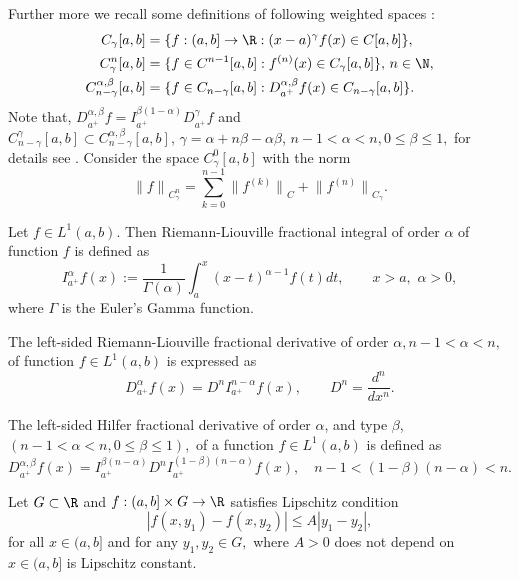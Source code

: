  Further more we recall some
definitions of following weighted spaces \cite{kst}:
\begin{align}\label{e1}
  C_{\gamma}[a,b]&=\{f:(a,b]\to\R :  (x-a)^{\gamma}f(x)\in C[a,b]\},\nonumber\\
  C_{\gamma}^{n}[a,b]&=\{f\in C^{n-1}[a,b]:f^{(n)}(x)\in C_{\gamma}[a,b]\},\, n\in \N,\\
  C_{n-\gamma}^{\alpha,\beta}[a,b]&=\{f\in C_{n-\gamma}[a,b]:D_{a^+}^{\alpha,\beta}f(x)\in C_{n-\gamma}[a,b]\}.\nonumber
\end{align}
Note that,
$D_{a^+}^{\alpha,\beta}f=I_{a^+}^{\beta(1-\alpha)}D_{a^+}^{\gamma}f$ and
$C_{n-\gamma}^{\gamma}[a,b]\subset
C_{n-\gamma}^{\alpha,\beta}[a,b],\,\gamma=\alpha+n\beta-\alpha\beta$,
$n-1<\alpha<n, 0\leq\beta\leq1,$ for details see \cite{kmf}. Consider the
space $ C_{\gamma}^{0}[a,b]$ with the norm
\begin{equation}\label{n1}
{\|f\|}_{C_{\gamma}^{n}}=\sum_{k=0}^{n-1}{\|f^{(k)}\|}_{C}+{\|f^{(n)}\|}_{C_{\gamma}}.
\end{equation}


\begin{defn}\cite{kst}
Let $f\in L^{1}(a,b).$ Then Riemann-Liouville fractional integral of order
$\alpha$ of function $f$ is defined as
\begin{equation}\label{d1}
I_{a^+}^{\alpha}f(x):=\frac{1}{\Gamma(\alpha)}\int_{a}^{x}(x-t)^{\alpha-1}f(t)dt,\qquad x>a,\,\, \alpha>0,
\end{equation}
where $\Gamma$ is the Euler's Gamma function.
\end{defn}
\begin{defn} \cite{kst}
The left-sided Riemann-Liouville fractional derivative of order $\alpha,
n-1<\alpha<n,$ of function $f\in L^{1}(a,b)$ is expressed as
  \begin{equation}\label{d2}
    D_{a^+}^{\alpha}f(x)=D^{n}I_{a^+}^{n-\alpha}f(x),\qquad D^n=\frac{d^n}{dx^n}.
  \end{equation}
\end{defn}
\begin{defn} \cite{hr} The left-sided Hilfer fractional derivative of order $\alpha$, and type $\beta$, $(n-1<\alpha<n,0\leq\beta\leq1),$ of a function $f\in L^{1}(a,b)$ is defined as
  \begin{equation}\label{d3}
    D_{a^+}^{\alpha,\beta}f(x)=I_{a^+}^{\beta(n-\alpha)}D^{n}I_{a^+}^{(1-\beta)(n-\alpha)}f(x),\quad n-1<(1-\beta)(n-\alpha)<n.
  \end{equation}
\end{defn}
\begin{defn}
Let $G\subset\R$ and $f:(a,b]\times G\rightarrow\R$ satisfies Lipschitz
condition
\begin{equation}\label{d4}
  |f(x,y_1)-f(x,y_2)|\leq A|y_1-y_2|,
\end{equation}
for all $x\in(a,b]$ and for any $y_1,y_2\in G,$ where $A>0$ does not depend
on $x\in(a,b]$ is Lipschitz constant.
\end{defn}